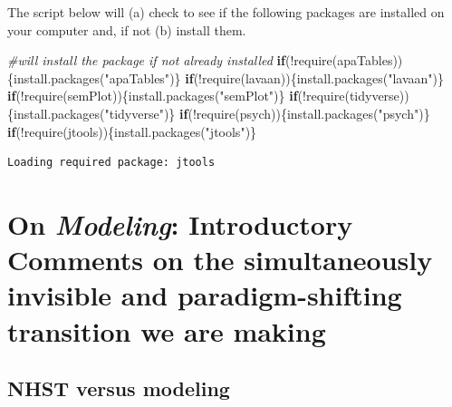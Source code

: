 \documentclass[
  11pt,
]{book}
\newenvironment{Shaded}{\begin{snugshade}}{\end{snugshade}}
\newcommand{\CommentTok}[1]{\textcolor[rgb]{0.56,0.35,0.01}{\textit{#1}}}
\newcommand{\ControlFlowTok}[1]{\textcolor[rgb]{0.13,0.29,0.53}{\textbf{#1}}}
\newcommand{\FunctionTok}[1]{\textcolor[rgb]{0.00,0.00,0.00}{#1}}
\newcommand{\NormalTok}[1]{#1}
\newcommand{\SpecialCharTok}[1]{\textcolor[rgb]{0.00,0.00,0.00}{#1}}
\newcommand{\StringTok}[1]{\textcolor[rgb]{0.31,0.60,0.02}{#1}}
\begin{document}
The script below will (a) check to see if the following packages are installed on your computer and, if not (b) install them.

\begin{Shaded}
\begin{Highlighting}[]
\CommentTok{\#will install the package if not already installed}
\ControlFlowTok{if}\NormalTok{(}\SpecialCharTok{!}\FunctionTok{require}\NormalTok{(apaTables))\{}\FunctionTok{install.packages}\NormalTok{(}\StringTok{"apaTables"}\NormalTok{)\}}
\ControlFlowTok{if}\NormalTok{(}\SpecialCharTok{!}\FunctionTok{require}\NormalTok{(lavaan))\{}\FunctionTok{install.packages}\NormalTok{(}\StringTok{"lavaan"}\NormalTok{)\}}
\ControlFlowTok{if}\NormalTok{(}\SpecialCharTok{!}\FunctionTok{require}\NormalTok{(semPlot))\{}\FunctionTok{install.packages}\NormalTok{(}\StringTok{"semPlot"}\NormalTok{)\}}
\ControlFlowTok{if}\NormalTok{(}\SpecialCharTok{!}\FunctionTok{require}\NormalTok{(tidyverse))\{}\FunctionTok{install.packages}\NormalTok{(}\StringTok{"tidyverse"}\NormalTok{)\}}
\ControlFlowTok{if}\NormalTok{(}\SpecialCharTok{!}\FunctionTok{require}\NormalTok{(psych))\{}\FunctionTok{install.packages}\NormalTok{(}\StringTok{"psych"}\NormalTok{)\}}
\ControlFlowTok{if}\NormalTok{(}\SpecialCharTok{!}\FunctionTok{require}\NormalTok{(jtools))\{}\FunctionTok{install.packages}\NormalTok{(}\StringTok{"jtools"}\NormalTok{)\}}
\end{Highlighting}
\end{Shaded}

\begin{verbatim}
Loading required package: jtools
\end{verbatim}

\hypertarget{on-modeling-introductory-comments-on-the-simultaneously-invisible-and-paradigm-shifting-transition-we-are-making}{%
\section{\texorpdfstring{On \emph{Modeling}: Introductory Comments on the simultaneously invisible and paradigm-shifting transition we are making}{On Modeling: Introductory Comments on the simultaneously invisible and paradigm-shifting transition we are making}}\label{on-modeling-introductory-comments-on-the-simultaneously-invisible-and-paradigm-shifting-transition-we-are-making}}

\hypertarget{nhst-versus-modeling}{%
\subsection{NHST versus modeling}\label{nhst-versus-modeling}}
\end{document}
